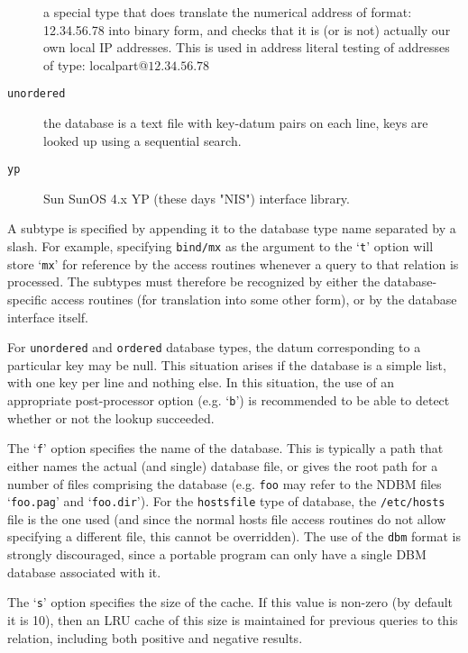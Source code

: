 \begin{description}
a special type that does translate the numerical address of format:
12.34.56.78
into binary form, and checks that it is (or is not) actually
our own local IP addresses. This is used in address literal
testing of addresses of type:
localpart@$12.34.56.78$

\item[{\tt unordered}] \mbox{}

the database is a text file with key-datum pairs on each line, keys are looked up using a sequential search.

\item[{\tt yp}] \mbox{}

Sun SunOS 4.x YP (these days "NIS") interface library.

\end{description}


A subtype is specified by appending it to the database type name separated
by a slash.  For example, specifying {\tt bind/mx} as the argument to the 
`{\tt t}' option will store `{\tt mx}' for reference by the access 
routines whenever a query to that relation is processed. The subtypes must 
therefore be recognized by either the database-specific access routines 
(for translation into some other form), or by the database interface itself.

For {\tt unordered} and {\tt ordered} database types, the datum 
corresponding to a particular key may be null.  This situation arises if 
the database is a simple list, with one key per line and nothing else.  
In this situation, the use of an appropriate post-processor option 
(e.g. `{\tt b}') is recommended to be able to detect whether or not 
the lookup succeeded.

The `{\tt f}' option specifies the name of the database.  This is typically a
path that either names the actual (and single) database file, or gives the
root path for a number of files comprising the database (e.g. {\tt foo} may
refer to the NDBM files `{\tt foo.pag}' and `{\tt foo.dir}').  For the 
{\tt hostsfile} type of database, the {\tt /etc/hosts} file is the one 
used (and since the normal hosts file access routines do not allow specifying 
a different file, this cannot be overridden). The use of the {\tt dbm} format 
is strongly discouraged, since a portable program can only have a single DBM 
database associated with it.

The `{\tt s}' option specifies the size of the cache.  If this value 
is non-zero (by default it is 10), then an LRU cache of this size is 
maintained for previous queries to this relation, including both positive 
and negative results.

